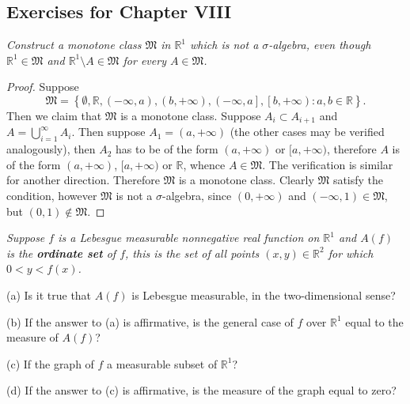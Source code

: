 \subsection{Exercises for Chapter VIII}
\begin{problem}\em
Construct a monotone class $\mathfrak{M}$ in $\mathbb{R}^1$ which is not a $\sigma$-algebra, even though $\mathbb{R}^1\in\mathfrak{M}$ and $\mathbb{R}^1\setminus A\in\mathfrak{M}$ for every $A\in\mathfrak{M}$.
\end{problem}
\begin{proof}
Suppose 
$$
\mathfrak{M} =\left\{ \emptyset ,\mathbb{R} ,\left( -\infty ,a \right) ,\left( b,+\infty \right) ,\left( -\infty ,a \right] ,\left[ b,+\infty \right) :a,b\in \mathbb{R} \right\} .
$$
Then we claim that $\mathfrak{M}$ is a monotone class. Suppose $A_i\subset A_{i+1}$ and $A=\bigcup_{i=1}^\infty A_i$. Then suppose $A_1=(a,+\infty)$ (the other cases may be verified analogously), then $A_2$ has to be of the form $(a,+\infty)$ or $[a,+\infty)$, therefore $A$ is of the form $(a,+\infty)$, $[a,+\infty)$ or $\mathbb{R}$, whence $A\in\mathfrak{M}$. The verification is similar for another direction. Therefore $\mathfrak{M}$ is a monotone class. Clearly $\mathfrak{M}$ satisfy the condition, however $\mathfrak{M}$ is not a $\sigma$-algebra, since $(0,+\infty)$ and $(-\infty,1)\in\mathfrak{M}$, but $(0,1)\notin\mathfrak{M}$.
\end{proof}
\begin{problem}\em
Suppose $f$ is a Lebesgue measurable nonnegative real function on $\mathbb{R}^1$ and $A(f)$ is the \textbf{ordinate set} of $f$, this is the set of all points $(x,y)\in\mathbb{R}^2$ for which $0<y<f(x)$.\par
(a) Is it true that $A(f)$ is Lebesgue measurable, in the two-dimensional sense?\par
(b) If the answer to (a) is affirmative, is the general case of $f$ over $\mathbb{R}^1$ equal to the measure of $A(f)$?\par
(c) If the graph of $f$ a measurable subset of $\mathbb{R}^1$?\par
(d) If the answer to (c) is affirmative, is the measure of the graph equal to zero?
\end{problem}
